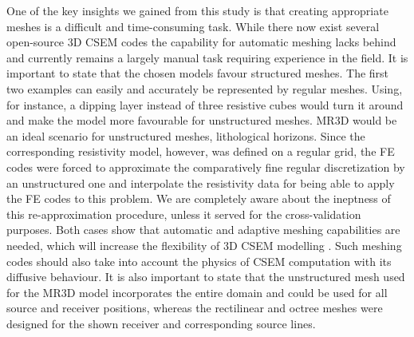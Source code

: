 \documentclass[extra, camera,%
]{gji}
\begin{document}
One of the key insights we gained from this study is that creating appropriate meshes is a difficult and time-consuming task. While there now exist several open-source 3D CSEM codes the capability for automatic meshing lacks behind and currently remains a largely manual task requiring experience in the field. It is important to state that the chosen models favour structured meshes. The first two examples can easily and accurately be represented by regular meshes. Using, for instance, a dipping layer instead of three resistive cubes would turn it around and make the model more favourable for unstructured meshes. MR3D would be an ideal scenario for unstructured meshes,  lithological horizons. Since the corresponding resistivity model, however, was defined on a regular grid, the FE codes were forced to approximate the comparatively fine regular discretization by an unstructured one and interpolate the resistivity data for being able to apply the FE codes to this problem. We are completely aware about the ineptness of this re-approximation procedure, unless it served for the cross-validation purposes. Both cases show that automatic and adaptive meshing capabilities are needed, which will increase the flexibility of 3D CSEM modelling . Such meshing codes should also take into account the physics of CSEM computation with its diffusive behaviour. It is also important to state that the unstructured mesh used for the MR3D model incorporates the entire domain and could be used for all source and receiver positions, whereas the rectilinear and octree meshes were designed for the shown receiver and corresponding source lines. 
\end{document}
